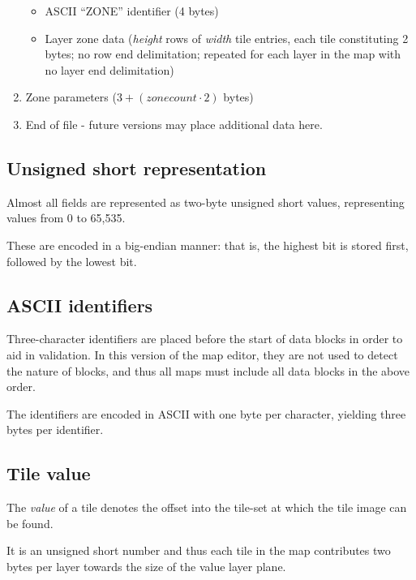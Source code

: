 \documentclass [12pt,a4paper]{article}
\begin{document}
\begin{enumerate}
\begin{itemize}
    \item ASCII ``ZONE'' identifier (4 bytes)
    \item Layer zone data (\emph{height} rows of \emph{width} tile entries,
      each tile constituting 2 bytes; no row end delimitation;
      repeated for each layer in the map with no layer end delimitation)

  \end{itemize}


  \item Zone parameters ($3 + (zonecount\cdot{}2)$ bytes)


  \item End of file - future versions may place additional data here.


\end{enumerate}


\subsection{Unsigned short representation}

Almost all fields are represented as two-byte unsigned short values,
representing values from 0 to 65,535.

These are encoded in a big-endian manner: that is, the highest bit is
stored first, followed by the lowest bit.


\subsection{ASCII identifiers}

Three-character identifiers are placed before the start of data blocks
in order to aid in validation.  In this version of the map editor,
they are not used to detect the nature of blocks, and thus all maps
must include all data blocks in the above order.

The identifiers are encoded in ASCII with one byte per character,
yielding three bytes per identifier.


\subsection{Tile value}

The \emph{value} of a tile denotes the offset into the tile-set at
which the tile image can be found.

It is an unsigned short number and thus each tile in the map
contributes two bytes per layer towards the size of the value layer
plane.
\end{document}
